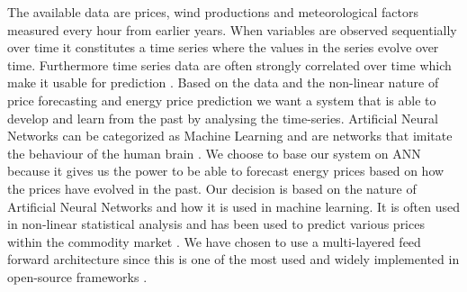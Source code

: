 The available data are prices, wind productions and meteorological factors measured every hour from earlier years. When variables are observed sequentially over time it constitutes a time series where the values in the series evolve over time. Furthermore time series data are often strongly correlated over time which make it usable for prediction \cite[Chapter~7.1.2]{econometrics}. Based on the data and the non-linear nature of price forecasting and energy price prediction we want a system that is able to develop and learn from the past by analysing the time-series. Artificial Neural Networks can be categorized as Machine Learning \cite{18} and are networks that imitate the behaviour of the human brain \cite{1}. We choose to base our system on ANN because it gives us the power to be able to forecast energy prices based on how the prices have evolved in the past. Our decision is based on the nature of Artificial Neural Networks and how it is used in machine learning. It is often used in non-linear statistical analysis \cite{16} and has been used to predict various prices within the commodity market \cite{2,3,stockForecasting,pjmForecast}. We have chosen to use a multi-layered feed forward architecture since this is one of the most used and widely implemented in open-source frameworks \cite{17}.

